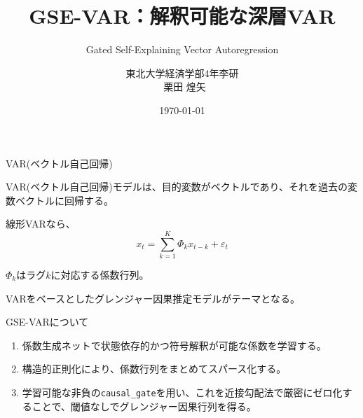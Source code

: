 \documentclass[dvipdfmx,11pt]{beamer}
\title[GSE-VAR]{GSE-VAR：解釈可能な深層VAR}
\subtitle{Gated Self-Explaining Vector Autoregression}
\author[栗田 煌矢]{
  東北大学経済学部4年李研\texorpdfstring{\\}{ }\
  栗田 煌矢}
\date{\today}
\begin{document}
\begin{frame}
  \titlepage
\end{frame}


\begin{frame}{VAR(ベクトル自己回帰)}



VAR(ベクトル自己回帰)モデルは、目的変数がベクトルであり、それを過去の変数ベクトルに回帰する。

\vspace{0.5em}

線形VARなら、
  \[
    x_t
    =
    \sum_{k=1}^{K}
    \Phi_k x_{t-k}
    +
    \varepsilon_t
  \]

$\Phi_k$はラグ$k$に対応する係数行列。

VARをベースとしたグレンジャー因果推定モデルがテーマとなる。



\end{frame}



\begin{frame}{GSE-VARについて}

  \begin{enumerate}
    \item 係数生成ネットで状態依存的かつ符号解釈が可能な係数を学習する。
    \item 構造的正則化により、係数行列をまとめてスパース化する。
    \item 学習可能な非負の\texttt{causal\_gate}を用い、これを近接勾配法で厳密にゼロ化することで、閾値なしでグレンジャー因果行列を得る。
  \end{enumerate}

\end{frame}
\end{document}
